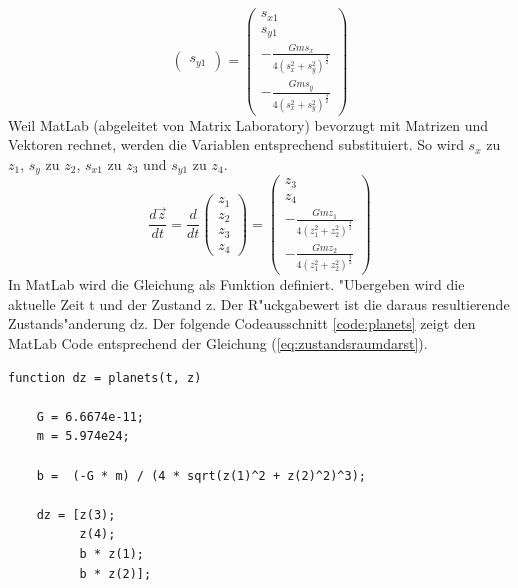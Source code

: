 \begin{refsection}
\begin{equation}
\begin{pmatrix}
s_{y1}
\end{pmatrix} = \begin{pmatrix}
s_{x1} \\ 
s_{y1}\\
-\frac{G m s_x}{4(s_x^2 + s_y^2)^\frac32} \\
-\frac{G m s_y}{4(s_x^2 + s_y^2)^\frac32}
\end{pmatrix}
\end{equation}
Weil MatLab (abgeleitet von Matrix Laboratory) bevorzugt mit Matrizen und Vektoren rechnet, werden die Variablen entsprechend substituiert.
So wird $s_x$ zu $z_1$, $s_y$ zu $z_2$, $s_{x1}$ zu $z_3$ und $s_{y1}$ zu $z_4$.
\begin{equation}\label{eq:zustandsraumdarst}
\frac{d \vec{z}}{dt}=\frac{d}{dt} \begin{pmatrix}
z_1 \\ 
z_2 \\
z_3 \\
z_4
\end{pmatrix} = \begin{pmatrix}
z_3 \\ 
z_4 \\
-\frac{G m z_1}{4(z_1^2 + z_2^2)^\frac32} \\
-\frac{G m z_2}{4(z_1^2 + z_2^2)^\frac32}
\end{pmatrix}
\end{equation}
In MatLab wird die Gleichung als Funktion definiert.
"Ubergeben wird die aktuelle Zeit t und der Zustand z.
Der R"uckgabewert ist die daraus resultierende  Zustands"anderung dz.
Der folgende Codeausschnitt \ref{code:planets} zeigt den MatLab Code entsprechend der Gleichung (\ref{eq:zustandsraumdarst}).
\begin{lstlisting}[style=Matlab, caption={Problemfunktion}, captionpos=b, label={code:planets}]
function dz = planets(t, z)

    G = 6.6674e-11;
    m = 5.974e24;

    b =  (-G * m) / (4 * sqrt(z(1)^2 + z(2)^2)^3);
    
    dz = [z(3);
          z(4);
          b * z(1);
          b * z(2)];
      

\end{lstlisting}
\end{refsection}
